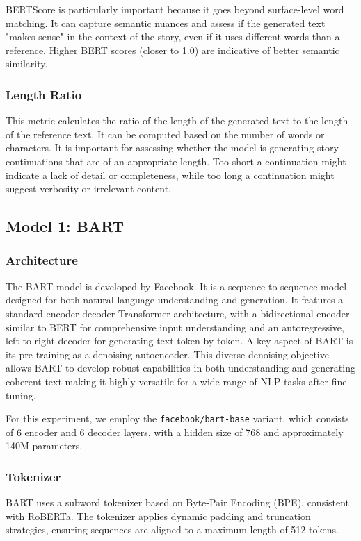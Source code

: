 \documentclass[11pt]{article}
\begin{document}
BERTScore is particularly important because it goes beyond surface-level word matching. It can capture semantic nuances and assess if the generated text "makes sense" in the context of the story, even if it uses different words than a reference. 
Higher BERT scores (closer to 1.0) are indicative of better semantic similarity.

\subsubsection{Length Ratio}
This metric calculates the ratio of the length of the generated text to the length of the reference text. It can be computed based on the number of words or characters.
It is important for assessing whether the model is generating story continuations that are of an appropriate length. Too short a continuation might indicate a lack of detail or completeness, while too long a continuation might suggest verbosity or irrelevant content.


\subsection{Model 1: BART}
\subsubsection{Architecture}

The BART model is developed by Facebook. It is a sequence-to-sequence model designed for both natural language understanding and generation. It features a standard encoder-decoder Transformer architecture, with a bidirectional encoder similar to BERT for comprehensive input understanding and an autoregressive, left-to-right decoder for generating text token by token. 
A key aspect of BART is its pre-training as a denoising autoencoder. This diverse denoising objective allows BART to develop robust capabilities in both understanding and generating coherent text making it highly versatile for a wide range of NLP tasks after fine-tuning.

For this experiment, we employ the \texttt{facebook/bart-base} variant, which consists of 6 encoder and 6 decoder layers, with a hidden size of 768 and approximately 140M parameters.

\subsubsection{Tokenizer}

BART uses a subword tokenizer based on Byte-Pair Encoding (BPE), consistent with RoBERTa. The tokenizer applies dynamic padding and truncation strategies, ensuring sequences are aligned to a maximum length of 512 tokens.
\end{document}
